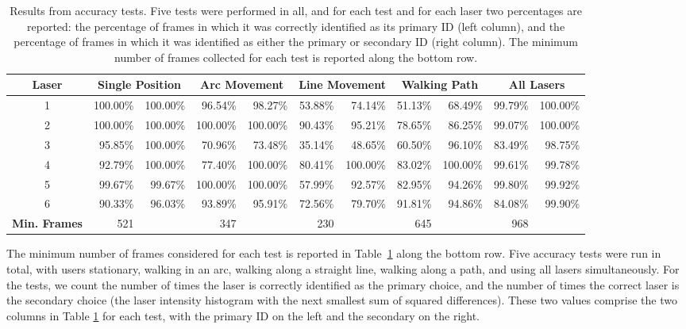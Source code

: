 \documentclass[review]{vgtc}                 %
\begin{document}
\begin{table} [t]
\centering

\begin{tabular}{ | c | r | r | r | r | r | r | r | r | r | r | }
 \hline
 \textbf{Laser} & \multicolumn{2}{|c|}{\textbf{Single Position}} & \multicolumn{2}{|c|}{\textbf{Arc Movement}} & \multicolumn{2}{|c|}{\textbf{Line Movement}} & 
                  \multicolumn{2}{|c|}{\textbf{Walking Path}} & \multicolumn{2}{|c|}{\textbf{All Lasers}} \\
 \hline
  1 & 100.00\% & 100.00\%& 96.54\% & 98.27\% & 53.88\% & 74.14\% & 51.13\% & 68.49\% & 99.79\% & 100.00\% \\
  2 & 100.00\% & 100.00\% & 100.00\% & 100.00\% & 90.43\% & 95.21\% & 78.65\% & 86.25\% & 99.07\% & 100.00\% \\
  3 & 95.85\% & 100.00\% & 70.96\% & 73.48\% & 35.14\% & 48.65\% & 60.50\% & 96.10\% & 83.49\% & 98.75\% \\
  4 & 92.79\% & 100.00\% & 77.40\% & 100.00\% & 80.41\% & 100.00\% & 83.02\% & 100.00\% & 99.61\% & 99.78\% \\
  5 & 99.67\% & 99.67\% & 100.00\% & 100.00\% & 57.99\% & 92.57\% & 82.95\% & 94.26\% & 99.80\% & 99.92\% \\
  6 & 90.33\% & 96.03\% & 93.89\% & 95.91\% & 72.56\% & 79.70\% & 91.81\% & 94.86\% & 84.08\% & 99.90\% \\
  \hline
  \textbf{Min. Frames} & 521 & & 347 & & 230 & & 645 & & 968 & \\
 \hline  
\end{tabular}


\caption{\label{table:AccuracyTestingResults}Results from accuracy
  tests. Five tests were performed in all, and for each test and for
  each laser two percentages are reported: the percentage of frames in
  which it was correctly identified as its primary ID (left column), and the
  percentage of frames in which it was identified as either the primary or secondary
  ID (right column). The minimum number of frames collected for each test is reported
  along the bottom row. }

\end{table}

The minimum number of frames considered for each test is reported in
Table~\ref{table:AccuracyTestingResults} along the bottom row. Five
accuracy tests were run in total, with users stationary, walking in an
arc, walking along a straight line, walking along a path, and using
all lasers simultaneously. For the tests, we count the number of times
the laser is correctly identified as the primary choice, and the number of times the correct
laser is the secondary choice (the laser intensity histogram with the
next smallest sum of squared differences). These two values comprise
the two columns in Table \ref{table:AccuracyTestingResults} for each
test, with the primary ID on the left and the secondary on the right.
\end{document}
